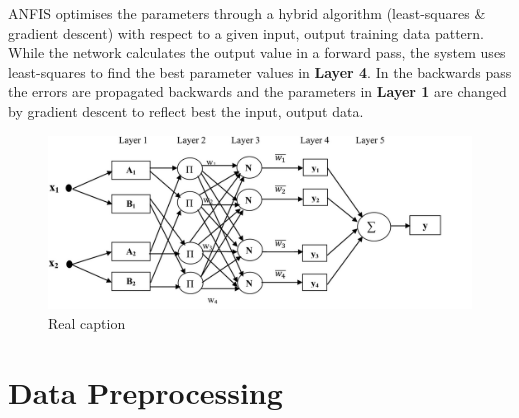  
 ANFIS optimises the parameters through a hybrid algorithm (least-squares \& gradient descent) with respect to a given input, output training data pattern. While the network calculates the output value in a forward pass, the system uses least-squares to find the best parameter values in \textbf{Layer 4}. In the backwards pass the errors are propagated backwards and the parameters in \textbf{Layer 1} are changed by gradient descent to reflect best the input, output data.
 
  




\begin{figure}[H]
        \centering
         \includegraphics[width=1\textwidth ]{img/model/gnn_fuzz}
         \begin{minipage}{\linewidth}
\caption[Caption for LOF]{Real caption\footnotemark}
\end{minipage}      
       
        \label{fig:gnn_fuzz}
\end{figure}






\section{Data Preprocessing}
\label{dataprocessing}

